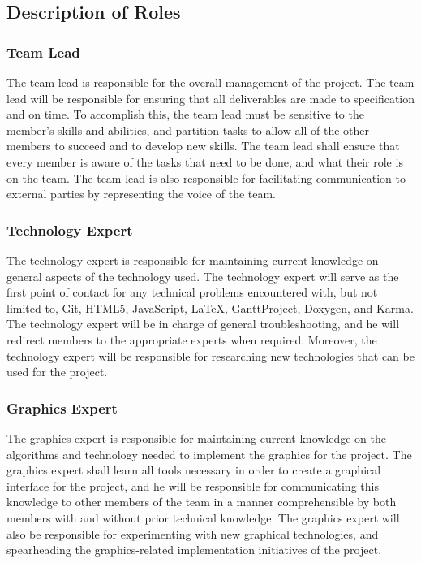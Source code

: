 \documentclass{article}
\begin{document}
\subsection{Description of Roles}

\subsubsection{Team Lead}
The team lead is responsible for the overall management of the project. The team 
lead will be responsible for ensuring that all deliverables are made to 
specification and on time. To accomplish this, the team lead must be sensitive 
to the member's skills and abilities, and partition tasks to allow all of the 
other members to succeed and to develop new skills. The team lead shall ensure 
that every member is aware of the tasks that need to be done, and what their 
role is on the team. The team lead is also responsible for facilitating 
communication to external parties by representing the voice of the team.

\subsubsection{Technology Expert}
The technology expert is responsible for maintaining current knowledge on 
general aspects of the technology used. The technology expert will serve as the 
first point of contact for any technical problems encountered with, but not 
limited to, Git, HTML5, JavaScript, \LaTeX, GanttProject, Doxygen, and Karma. 
The technology expert will be in charge of general troubleshooting, and he will 
redirect members to the appropriate experts when required. Moreover, the 
technology expert will be responsible for researching new technologies that can 
be used for the project.

\subsubsection{Graphics Expert}
The graphics expert is responsible for maintaining current knowledge on the 
algorithms and technology needed to implement the graphics for the project. The 
graphics expert shall learn all tools necessary in order to create a graphical 
interface for the project, and he will be responsible for communicating this 
knowledge to other members of the team in a manner comprehensible by both 
members with and without prior technical knowledge. The graphics expert will 
also be responsible for experimenting with new graphical technologies, and 
spearheading the graphics-related implementation initiatives of the project. 
\end{document}
